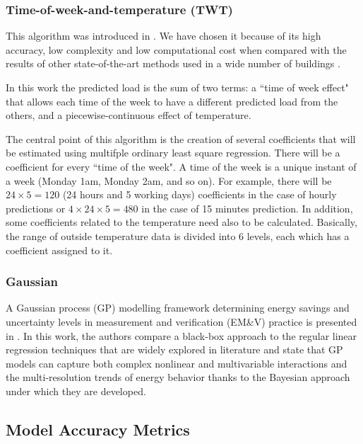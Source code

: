 \documentclass[10pt, conference, compsocconf]{IEEEtran}
\begin{document}
\subsubsection{Time-of-week-and-temperature (TWT)}

This algorithm was introduced in \cite{mathieu2011quantifying}. We have chosen it because of its high accuracy, low complexity and low computational cost when compared with the results of other state-of-the-art methods used in a wide number of buildings \cite{granderson2016accuracy}. 

In this work the predicted load is the sum of two terms: a ``time of week effect" that allows each time of the week to have a different predicted load from the others, and a piecewise-continuous effect of temperature. 

The central point of this algorithm is the creation of several coefficients that will be estimated using multifple ordinary least square regression. There will be a coefficient for every ``time of the week". A time of the week is a unique instant of a week (Monday 1am, Monday 2am, and so on). For example, there will be $24 \times 5 = 120$ (24 hours and 5 working days) coefficients in the case of hourly predictions or  $4\times 24 \times 5 = 480$ in the case of 15 minutes prediction. In addition, some coefficients related to the temperature need also to be calculated. Basically, the range of outside temperature data is divided into 6 levels, each which has a coefficient assigned to it.

\subsubsection{Gaussian}

A Gaussian process (GP) modelling framework determining energy savings and uncertainty levels in measurement and verification (EM\&V) practice is presented in \cite{heo2012gaussian}.  In this work, the authors compare a black-box approach to the regular linear regression techniques that are widely explored in literature and state that GP models can capture both complex nonlinear and multivariable interactions and the multi-resolution trends of energy behavior thanks to the Bayesian approach under which they are developed. 

\subsection{Model Accuracy Metrics}
\end{document}
